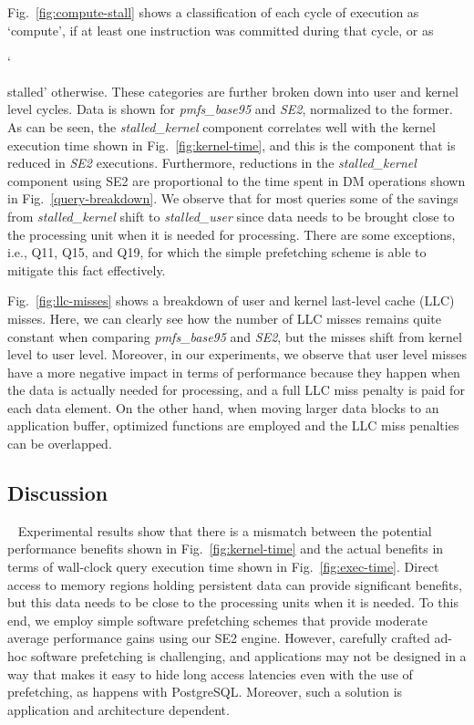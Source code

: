 Fig.~\ref{fig:compute-stall} shows a classification of each cycle of execution as {\lq{compute}\rq}, if at least one 
instruction was committed during that cycle, or as {\lq{stalled{\rq} otherwise. These categories are further broken down 
into user and kernel level cycles. Data is shown for \textit{pmfs\_base95} and \textit{SE2}, normalized to the former. 
As can be seen, the \textit{stalled\_kernel} component correlates well with the kernel execution time shown in Fig.~\ref{fig:kernel-time}, 
and this is the component that is reduced in \textit{SE2} executions. 
Furthermore, reductions in the \textit{stalled\_kernel} component using SE2 are proportional to the 
time spent in DM operations shown in Fig.~\ref{query-breakdown}. 
We observe that for most queries some of the savings from \textit{stalled\_kernel} 
shift to \textit{stalled\_user} since data needs to be brought close to the processing unit when it is needed for processing. 
There are some exceptions, i.e., Q11, Q15, and Q19, for which the simple prefetching scheme is able to mitigate this fact effectively.



Fig.~\ref{fig:llc-misses} shows a breakdown of user and kernel last-level cache (LLC) misses. Here, 
we can clearly see how the number of LLC misses remains quite constant when comparing \textit{pmfs\_base95} and \textit{SE2}, 
but the misses shift from kernel level to user level. Moreover, in our experiments, we observe that user level misses have a 
more negative impact in terms of performance because they happen when the data is actually needed for processing, and a full LLC 
miss penalty is paid for each data element. On the other hand, when moving larger data blocks to an application buffer, optimized 
functions are employed and the LLC miss penalties can be overlapped.


\subsection{Discussion}~\label{Discussion}
Experimental results show that there is a mismatch between the potential performance benefits shown in Fig.~\ref{fig:kernel-time} and the actual benefits 
in terms of wall-clock query execution time 
shown in Fig.~\ref{fig:exec-time}. Direct access to memory regions holding persistent data can provide 
significant benefits, but this data needs to be close to the processing units when it is needed. To this end, we employ 
simple software prefetching schemes that provide moderate average performance gains using our SE2 engine. However, carefully crafted ad-hoc software 
prefetching is challenging, and applications may not be designed in a way that makes it easy to hide long access latencies even 
with the use of prefetching, as happens with PostgreSQL. Moreover, such a solution is application and architecture dependent.

}}
